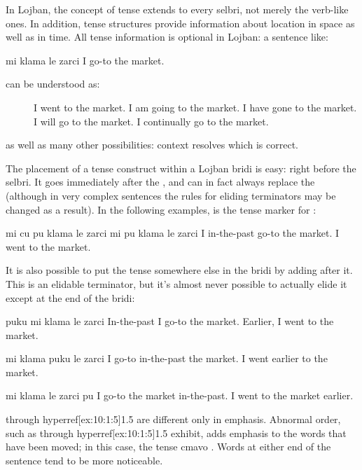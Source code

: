 In Lojban, the concept of tense extends to every selbri, not
    merely the verb-like ones. In addition, tense structures
    provide information about location in space as well as in time.
    All tense information is optional in Lojban: a sentence
    like:
\begin{example}
mi klama le zarci\n
I go-to the market.
\end{example}

{\noindent}can be understood as: 
\begin{description}
\item[] I went to the market. I am going to the market. I have gone to the market. I will go to the market. I continually go to the market.
\end{description}

as well as many other possibilities: context resolves which is
    correct. 

The placement of a tense construct within a Lojban bridi is
    easy: right before the selbri. It goes immediately after the
    , and can in fact always replace the  (although in
    very complex sentences the rules for eliding terminators may be
    changed as a result). In the following examples,  is the
    tense marker for :
\begin{example}
mi cu pu klama le zarci\n
mi pu klama le zarci\n
I in-the-past go-to the market.\n
I went to the market.
\end{example}

It is also possible to put the tense somewhere else in the
    bridi by adding  after it. This  is an elidable
    terminator, but it's almost never possible to actually elide it
    except at the end of the bridi:
\begin{example}
puku mi klama le zarci\n
In-the-past I go-to the market.\n
Earlier, I went to the market.
\end{example}

\begin{example}
mi klama puku le zarci\n
I go-to in-the-past the market.\n
I went earlier to the market.
\end{example}

\begin{example}
mi klama le zarci pu \n
I go-to the market in-the-past.\n
I went to the market earlier.
\end{example}

 through hyperref[ex:10:1:5]{1.5} are different only in emphasis. Abnormal
    order, such as  through hyperref[ex:10:1:5]{1.5} exhibit, adds emphasis to the words that
    have been moved; in this case, the tense cmavo . Words at
    either end of the sentence tend to be more noticeable.




